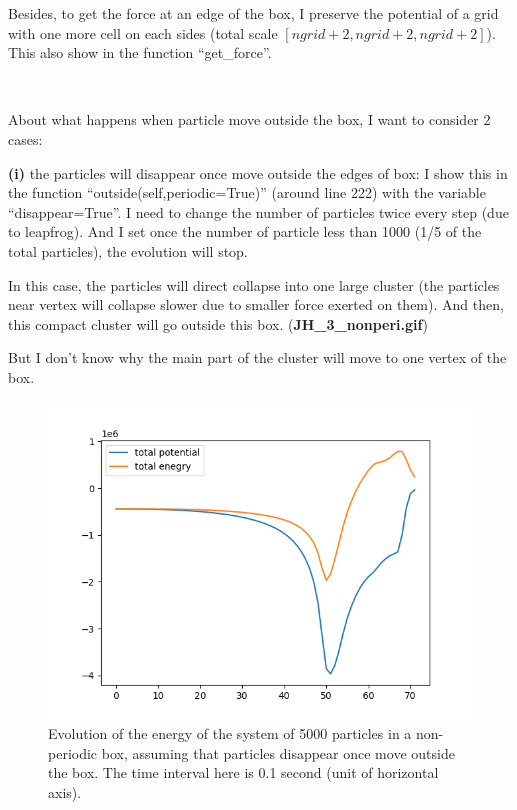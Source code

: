\documentclass[showpacs, oneside, onecolumn, prl, amsmath, amssymb, nofootinbib, superscriptaddress, notitlepage]{revtex4-1}
\newcommand\bfig{\begin{figure}}
\newcommand\efig{\end{figure}}
\begin{document}
Besides, to get the force at an edge of the box, I preserve the potential of a grid with one more cell on each sides (total scale $[ngrid+2,ngrid+2,ngrid+2]$). This also show in the function ``get\_force''.


~~~~

About what happens when particle move outside the box, I want to consider 2 cases:

\textbf{(i)} the particles will disappear once move outside the edges of box:\newline
I show this in the function ``outside(self,periodic=True)'' (around line 222) with the variable ``disappear=True''. I need to change the number of particles twice every step (due to leapfrog). And I set once the number of particle less than 1000 (1/5 of the total particles), the evolution will stop.

In this case, the particles will direct collapse into one large cluster (the particles near vertex will collapse slower due to smaller force exerted on them). And then, this compact cluster will go outside this box.\newline
(\textbf{JH\_3\_nonperi.gif})

But I don't know why the main part of the cluster will move to one vertex of the box.

\bfig
	\centering
	\includegraphics[scale=0.8]{JH_3_nonperi_energy.png}
	\caption{Evolution of the energy of the system of 5000 particles in a non-periodic box, assuming that particles disappear once move outside the box. The time interval here is 0.1 second (unit of horizontal axis).}
	\label{3-nonperi-energy}
\efig
\end{document}
